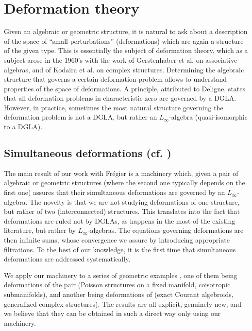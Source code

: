 \documentclass[11pt]{amsart}
\begin{document}
  
 


\section{Deformation theory} 
Given an algebraic or geometric structure, it is natural to ask about a description of the space of  ``small 
perturbations'' (deformations) which are again a structure of the given type.  This is essentially the 
subject of deformation theory, which as a subject arose in the 1960's with the work of  
Gerstenhaber et al. on  associative algebras, and of Kodaira et al. on complex structures. 
 Determining the algebraic structure that governs a certain deformation problem  allows to understand properties of the space of deformations.
A principle, attributed to Deligne, states that all deformation problems in characteristic zero are governed by a DGLA. However, in practice, sometimes the most natural structure governing the deformation  problem is not a DGLA, but rather an $L_{\infty}$-algebra (quasi-isomorphic to a DGLA). 

\subsection{Simultaneous deformations (cf. \cite{FZgeo}\cite{FZalg})} 
The main result of our   work  with   Fr\'egier  \cite{FZgeo} is a machinery which, given a pair of 
algebraic or geometric structures (where the second one typically depends on the first 
one) assures that their simultaneous deformations are governed by an $L_{\infty}$-algebra. The novelty is that we are not studying 
deformations of one structure, but rather of two (interconnected) structures. This translates into the fact 
that deformations are ruled not by DGLAs, as   happens in the most of the existing literature, but rather 
by $L_{\infty}$-algebras. The equations governing deformations are then infinite sums, whose convergence we assure by introducing appropriate filtrations.  To the best of our knowledge, it is the first time that simultaneous deformations 
are addressed systematically. 

We apply our machinery to a series of geometric examples \cite{FZgeo}, one of them being deformations of the pair (Poisson 
structures on a fixed manifold, coisotropic submanifolds), and another being deformations of (exact Courant algebroids, generalized complex structures). The results are all explicit, genuinely new, and we believe that they can be obtained in such a direct way only using our machinery.
\end{document}
